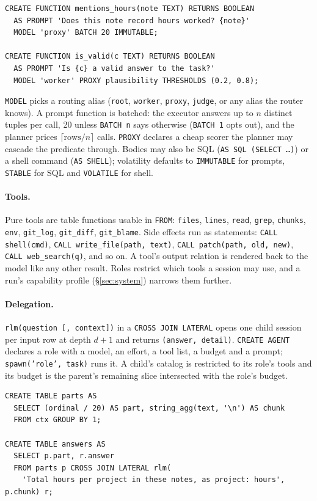 \documentclass[11pt,a4paper]{article}
\newcommand{\code}[1]{\texttt{#1}}
\begin{document}
\begin{lstlisting}
CREATE FUNCTION mentions_hours(note TEXT) RETURNS BOOLEAN
  AS PROMPT 'Does this note record hours worked? {note}'
  MODEL 'proxy' BATCH 20 IMMUTABLE;

CREATE FUNCTION is_valid(c TEXT) RETURNS BOOLEAN
  AS PROMPT 'Is {c} a valid answer to the task?'
  MODEL 'worker' PROXY plausibility THRESHOLDS (0.2, 0.8);
\end{lstlisting}

\code{MODEL} picks a routing alias (\code{root}, \code{worker}, \code{proxy},
\code{judge}, or any alias the router knows). A prompt function is batched:
the executor answers up to $n$ distinct tuples per call, 20 unless
\code{BATCH n} says otherwise (\code{BATCH 1} opts out), and the planner
prices $\lceil \text{rows}/n \rceil$ calls. \code{PROXY} declares a cheap
scorer the planner may cascade the predicate through. Bodies may also be SQL
(\code{AS SQL (SELECT \ldots)}) or a shell command (\code{AS SHELL}); volatility
defaults to \code{IMMUTABLE} for prompts, \code{STABLE} for SQL and
\code{VOLATILE} for shell.

\paragraph{Tools.} Pure tools are table functions usable in \code{FROM}:
\code{files}, \code{lines}, \code{read}, \code{grep}, \code{chunks}, \code{env},
\code{git\_log}, \code{git\_diff}, \code{git\_blame}. Side effects run as
statements: \code{CALL shell(cmd)}, \code{CALL write\_file(path, text)},
\code{CALL patch(path, old, new)}, \code{CALL web\_search(q)}, and so on. A
tool's output relation is rendered back to the model like any other result.
Roles restrict which tools a session may use, and a run's capability
profile (\S\ref{sec:system}) narrows them further.

\paragraph{Delegation.} \code{rlm(question [, context])} in a \code{CROSS JOIN
LATERAL} opens one child session per input row at depth $d+1$ and returns
\code{(answer, detail)}. \code{CREATE AGENT} declares a role with a model, an
effort, a tool list, a budget and a prompt; \code{spawn('role', task)} runs it.
A child's catalog is restricted to its role's tools and its budget is the
parent's remaining slice intersected with the role's budget.

\begin{lstlisting}
CREATE TABLE parts AS
  SELECT (ordinal / 20) AS part, string_agg(text, '\n') AS chunk
  FROM ctx GROUP BY 1;

CREATE TABLE answers AS
  SELECT p.part, r.answer
  FROM parts p CROSS JOIN LATERAL rlm(
    'Total hours per project in these notes, as project: hours', p.chunk) r;
\end{lstlisting}
\end{document}
